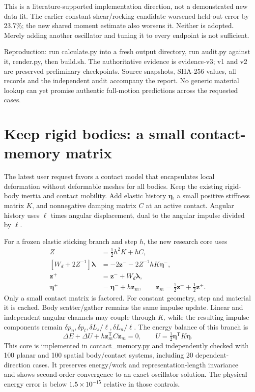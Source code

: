 \documentclass[10pt,a4paper]{article}
\begin{document}
This is a literature-supported implementation direction, not a demonstrated new
data fit. The earlier constant shear/rocking candidate worsened held-out error by
23.7\%; the new shared moment estimate also worsens it. Neither is adopted. Merely
adding another oscillator and tuning it to every endpoint is not sufficient.

Reproduction: run calculate.py into a fresh output directory, run audit.py against
it, render.py, then build.sh. The authoritative evidence is evidence-v3; v1 and v2
are preserved preliminary checkpoints. Source snapshots, SHA-256 values, all records
and the independent audit accompany the report. No generic material lookup can yet
promise authentic full-motion predictions across the requested cases.

\newpage
\section*{Keep rigid bodies: a small contact-memory matrix}

The latest user request favors a contact model that encapsulates local deformation
without deformable meshes for all bodies. Keep the existing rigid-body inertia and
contact mobility. Add elastic history $\boldsymbol\eta$, a small positive stiffness
matrix $K$, and nonnegative damping matrix $C$ at an active contact. Angular history
uses $\ell$ times angular displacement, dual to the angular impulse divided by $\ell$.

For a frozen elastic sticking branch and step $h$, the new research core uses
\begin{align*}
 Z&=\tfrac12h^2K+hC,\\
 [W_d+2Z^{-1}]\boldsymbol\lambda&=-2\mathbf z^- -2Z^{-1}hK\boldsymbol\eta^-,\\
 \mathbf z^+&=\mathbf z^-+W_d\boldsymbol\lambda,\\
 \boldsymbol\eta^+&=\boldsymbol\eta^-+h\mathbf z_m,\qquad
 \mathbf z_m=\tfrac12\mathbf z^-+\tfrac12\mathbf z^+.
\end{align*}
Only a small contact matrix is factored. For constant geometry, step and material
it is cached. Body scatter/gather remains the same impulse update. Linear and
independent angular channels may couple through $K$, while the resulting impulse
components remain $\delta p_n,\delta p_t,\delta L_s/\ell,\delta L_n/\ell$.
The energy balance of this branch is
\[
 \Delta E+\Delta U+h\mathbf z_m^{\mathsf T}C\mathbf z_m=0,\qquad
 U=\tfrac12\boldsymbol\eta^{\mathsf T}K\boldsymbol\eta.
\]
This core is implemented in contact\_memory.py and independently checked with
100 planar and 100 spatial body/contact systems, including 20 dependent-direction
cases. It preserves energy/work and representation-length invariance and shows
second-order convergence to an exact oscillator solution. The physical energy error
is below $1.5\times10^{-15}$ relative in those controls.
\end{document}

